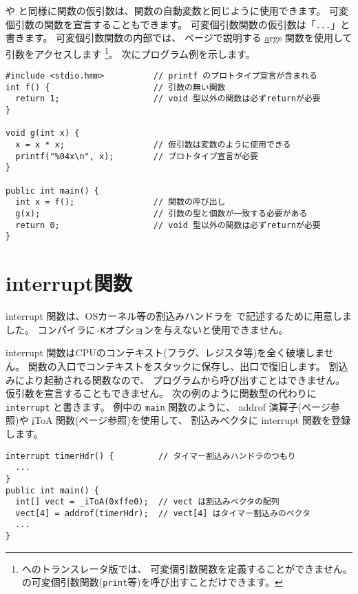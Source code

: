 \cl や \javal と同様に関数の仮引数は、関数の自動変数と同じように使用できます。
可変個引数の関数を宣言することもできます。
可変個引数関数の仮引数は「\verb/.../」と書きます。
可変個引数関数の内部では、
\pageref{chap4:args}ページで説明する
\ul args 関数を使用して引数をアクセスします
\footnote{\cl へのトランスレータ版では、
可変個引数関数を定義することができません。
\cl の可変個引数関数(\verb/print/等)を呼び出すことだけできます。}。
次にプログラム例を示します。

\begin{mylist}
\begin{verbatim}
#include <stdio.hmm>          // printf のプロトタイプ宣言が含まれる
int f() {                     // 引数の無い関数
  return 1;                   // void 型以外の関数は必ずreturnが必要
}

void g(int x) {
  x = x * x;                  // 仮引数は変数のように使用できる
  printf("%04x\n", x);        // プロトタイプ宣言が必要
}

public int main() {
  int x = f();                // 関数の呼び出し
  g(x);                       // 引数の型と個数が一致する必要がある
  return 0;                   // void 型以外の関数は必ずreturnが必要
}
\end{verbatim}
\end{mylist}

\section{interrupt関数}
interrupt 関数は、OSカーネル等の割込みハンドラを\cmml
で記述するために用意しました。
コンパイラに\verb/-K/オプションを与えないと使用できません。

interrupt 関数はCPUのコンテキスト(フラグ、レジスタ等)を全く破壊しません。
関数の入口でコンテキストをスタックに保存し、出口で復旧します。
割込みにより起動される関数なので、
プログラムから呼び出すことはできません。
仮引数を宣言することもできません。
次の例のように関数型の代わりに \verb/interrupt/ と書きます。
例中の \verb/main/ 関数のように、
addrof 演算子(\pageref{chap3:addrof}ページ参照)や
\ul iToA 関数(\pageref{chap4:itoa}ページ参照)を使用して、
割込みベクタに interrupt 関数を登録します。

\begin{mylist}
\begin{verbatim}
interrupt timerHdr() {         // タイマー割込みハンドラのつもり
  ...
}
public int main() {
  int[] vect = _iToA(0xffe0);  // vect は割込みベクタの配列
  vect[4] = addrof(timerHdr);  // vect[4] はタイマー割込みのベクタ
  ...
}
\end{verbatim}
\end{mylist}

